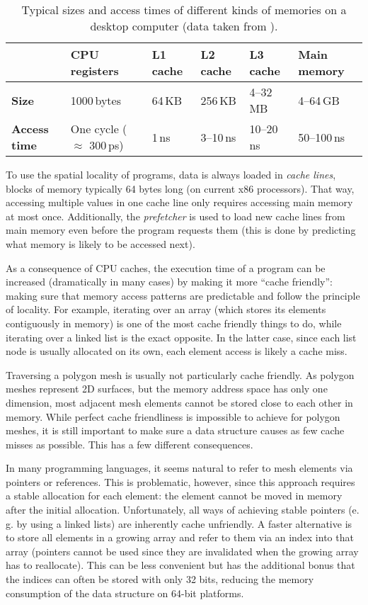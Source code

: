\begin{table}[t]
  \centering
  \small
  \sffamily
  \begin{tabular}{llllll}
  & \textbf{CPU registers} & \textbf{L1 cache} & \textbf{L2 cache} & \textbf{L3 cache} & \textbf{Main memory} \\\hline
  \textbf{Size} & 1000\,bytes & 64\,KB & 256\,KB & 4--32\,MB & 4--64\,GB \\\hline
  \textbf{Access time} & One cycle ($\approx$ 300\,ps) & 1\,ns & 3--10\,ns & 10--20\,ns & 50--100\,ns \\\hline
  \end{tabular}
  \caption{Typical sizes and access times of different kinds of memories on a desktop computer (data taken from \cite{hennessy2017computer}).}
  \label{tbl:caches}
\end{table}

To use the spatial locality of programs, data is always loaded in \emph{cache lines}, blocks of memory typically 64 bytes long (on current x86 processors).
That way, accessing multiple values in one cache line only requires accessing main memory at most once.
Additionally, the \emph{prefetcher} is used to load new cache lines from main memory even before the program requests them (this is done by predicting what memory is likely to be accessed next).

As a consequence of CPU caches, the execution time of a program can be increased (dramatically in many cases) by making it more \enquote{cache friendly}: making sure that memory access patterns are predictable and follow the principle of locality.
For example, iterating over an array (which stores its elements contiguously in memory) is one of the most cache friendly things to do, while iterating over a linked list is the exact opposite.
In the latter case, since each list node is usually allocated on its own, each element access is likely a cache miss.

Traversing a polygon mesh is usually not particularly cache friendly.
As polygon meshes represent 2D surfaces, but the memory address space has only one dimension, most adjacent mesh elements cannot be stored close to each other in memory.
While perfect cache friendliness is impossible to achieve for polygon meshes, it is still important to make sure a data structure causes as few cache misses as possible.
This has a few different consequences.

In many programming languages, it seems natural to refer to mesh elements via pointers or references.
This is problematic, however, since this approach requires a stable allocation for each element: the element cannot be moved in memory after the initial allocation.
Unfortunately, all ways of achieving stable pointers (e.\,g. by using a linked lists) are inherently cache unfriendly.
A faster alternative is to store all elements in a growing array and refer to them via an index into that array (pointers cannot be used since they are invalidated when the growing array has to reallocate).
This can be less convenient but has the additional bonus that the indices can often be stored with only 32 bits, reducing the memory consumption of the data structure on 64-bit platforms.

